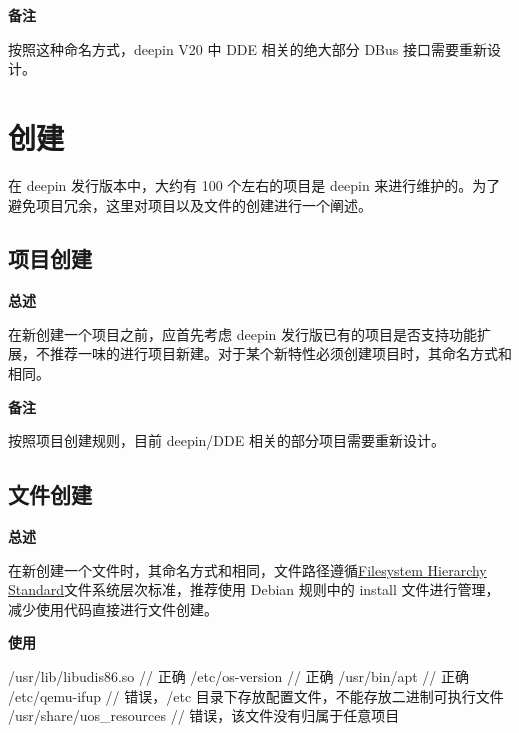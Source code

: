 \textbf{备注}

按照这种命名方式，deepin V20 中 DDE 相关的绝大部分 DBus 接口需要重新设计。

\chapter{创建}

在 deepin 发行版本中，大约有 100 个左右的项目是 deepin 来进行维护的。为了避免项目冗余，这里对项目以及文件的创建进行一个阐述。

\section{项目创建}

\textbf{总述}

在新创建一个项目之前，应首先考虑 deepin 发行版已有的项目是否支持功能扩展，不推荐一味的进行项目新建。对于某个新特性必须创建项目时，其命名方式和相同。



\textbf{备注}

按照项目创建规则，目前 deepin/DDE 相关的部分项目需要重新设计。

\section{文件创建}

\textbf{总述}

在新创建一个文件时，其命名方式和相同，文件路径遵循\href{https://refspecs.linuxfoundation.org/FHS_3.0/fhs-3.0.html}{Filesystem Hierarchy Standard}文件系统层次标准，推荐使用 Debian 规则中的 install 文件进行管理，减少使用代码直接进行文件创建。

\textbf{使用}

\begin{cppcode}
  /usr/lib/libudis86.so       // 正确
  /etc/os-version             // 正确
  /usr/bin/apt                // 正确
  /etc/qemu-ifup              // 错误，/etc 目录下存放配置文件，不能存放二进制可执行文件
  /usr/share/uos_resources    // 错误，该文件没有归属于任意项目
\end{cppcode}
